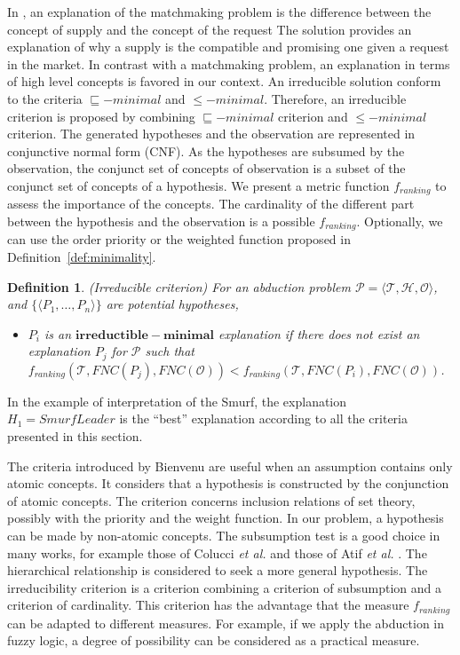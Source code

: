 \documentclass{article}
\newtheorem{mydef}{Definition}
\begin{document}
In \cite{di2007semantic}, an explanation of the matchmaking problem is the difference between the concept of supply and the concept of the request
The solution provides an explanation of why a supply is the compatible and promising one given a request in the market.
In contrast with a matchmaking problem, an explanation in terms of high level concepts is favored in our context. 
An irreducible solution conform to the criteria $\sqsubseteq-minimal$ and $\leq -minimal$.
Therefore, an irreducible criterion is proposed by combining $\sqsubseteq-minimal$ criterion and $\leq-minimal$ criterion.
The generated hypotheses and the observation are represented in conjunctive normal form (CNF).
As the hypotheses are subsumed by the observation, the conjunct set of concepts of observation is a subset of the conjunct set of concepts of a hypothesis.
We present a metric function $f_{ranking}$ to assess the importance of the concepts. The cardinality of the different part between the hypothesis
and the observation is a possible $f_{ranking}$. Optionally, we can use the order priority or the weighted function proposed in Definition~\ref{def:minimality}.
\begin{mydef}{(Irreducible criterion)}
For an abduction problem $\mathcal{P}=\langle \mathcal{T},\mathcal{H}, \mathcal{O}\rangle$, and $\{\langle P_{1},\dots,P_{n}\rangle\}$ are potential hypotheses,
\begin{itemize}
\item  $P_{i}$ is an $\bm{irreductible-minimal}$ explanation if there does not exist an explanation $P_{j}$ for $\mathcal{P}$ such that $f_{ranking}(\mathcal{T},FNC(P_{j}),FNC(\mathcal{O})) 
< f_{ranking}(\mathcal{T},FNC(P_{i}),FNC(\mathcal{O}))$.
\end{itemize}
\end{mydef}
In the example of interpretation of the Smurf, the explanation $H_1=SmurfLeader$ is the ``best'' explanation according to all the criteria presented
in this section.

The criteria introduced by Bienvenu are useful when an assumption contains only atomic concepts. It considers that a hypothesis is constructed by the conjunction of atomic concepts.
The criterion concerns inclusion relations of set theory, possibly with the priority and the weight function.
In our problem, a hypothesis can be made by non-atomic concepts. 
The subsumption test is a good choice in many works,
for example those of Colucci \textit{et al.} \cite{colucci2004uniform} and those of Atif \textit{et al.}  \cite{atif2014explanatory}. 
The hierarchical relationship is considered to seek a more general hypothesis.
The irreducibility criterion is a criterion combining a criterion of subsumption and a criterion of cardinality. This criterion has the advantage that the measure $f_{ranking}$  can be adapted to different measures.
For example, if we apply the abduction in fuzzy logic, a degree of possibility can be considered as a practical measure.
\end{document}
